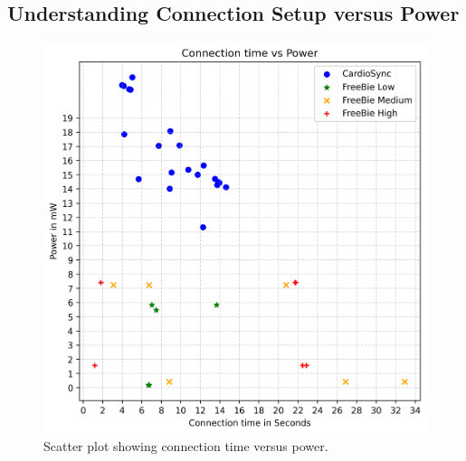 


\subsection{Understanding Connection Setup versus Power}
\begin{figure}[t]
    \centering
    \includegraphics[width=0.7\linewidth]{chapters/Results/Scatter_plot.png}
    \caption{Scatter plot showing connection time versus power.}
    \label{fig:scatter_conn_power}
\end{figure}

